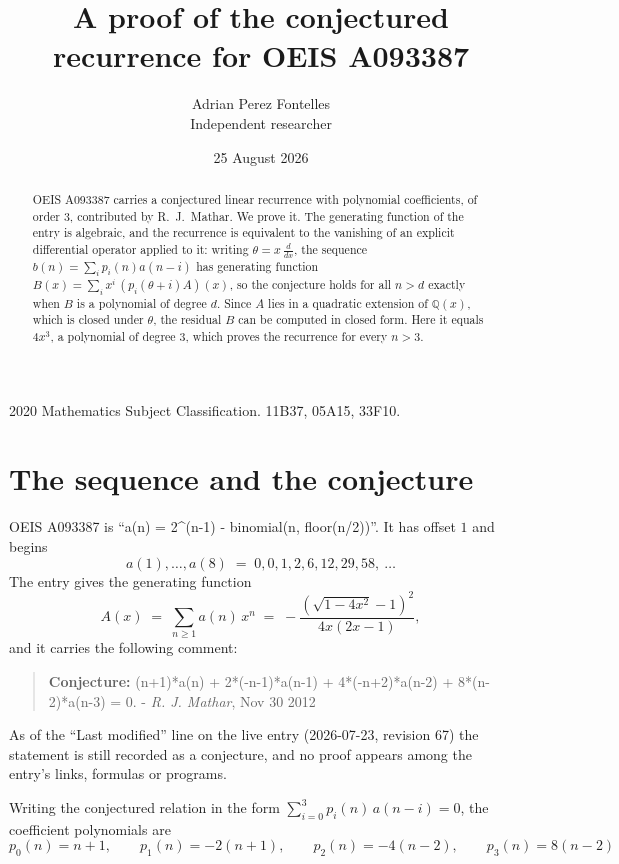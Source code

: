\documentclass[11pt,a4paper]{article}
\title{A proof of the conjectured recurrence for OEIS A093387}
\author{Adrian Perez Fontelles\\ \small Independent researcher}
\date{25 August 2026}
\theoremstyle{plain}
\theoremstyle{definition}
\begin{document}
\maketitle

\begin{abstract}
OEIS A093387 carries a conjectured linear recurrence with polynomial coefficients, of
order 3, contributed by R.~J.~Mathar. We prove it. The generating function of the
entry is algebraic, and the recurrence is equivalent to the vanishing of an explicit
differential operator applied to it: writing $\theta=x\,\frac{d}{dx}$, the sequence
$b(n)=\sum_{i}p_{i}(n)a(n-i)$ has generating function
$B(x)=\sum_{i}x^{i}\,(p_{i}(\theta+i)A)(x)$, so the conjecture holds for all $n>d$ exactly
when $B$ is a polynomial of degree $d$. Since $A$ lies in a quadratic extension of
$\mathbb{Q}(x)$, which is closed under $\theta$, the residual $B$ can be computed in
closed form. Here it equals $4 x^{3}$, a polynomial of degree $3$, which proves
the recurrence for every $n>3$.
\end{abstract}

\noindent\small 2020 Mathematics Subject Classification. 11B37, 05A15, 33F10.\normalsize

\section{The sequence and the conjecture}

OEIS A093387 is ``a(n) = 2\^{}(n-1) - binomial(n, floor(n/2))''. It has offset $1$ and begins
\[
a(1),\dots,a(8)\;=\;0, 0, 1, 2, 6, 12, 29, 58,\ \dots
\]
The entry gives the generating function
\begin{equation}\label{eq:gf}
A(x)\;=\;\sum_{n\ge 1} a(n)\,x^{n}\;=\;- \frac{\left(\sqrt{1 - 4 x^{2}} - 1\right)^{2}}{4 x \left(2 x - 1\right)} ,
\end{equation}
and it carries the following comment:
\begin{quote}\small
\textbf{Conjecture:} (n+1)*a(n) + 2*(-n-1)*a(n-1) + 4*(-n+2)*a(n-2) + 8*(n-2)*a(n-3) = 0. - \emph{R. J. Mathar}, Nov 30 2012
\end{quote}
As of the ``Last modified'' line on the live entry (2026-07-23, revision 67) the
statement is still recorded as a conjecture, and no proof appears among the entry's links,
formulas or programs.

Writing the conjectured relation in the form $\sum_{i=0}^{3}p_{i}(n)\,a(n-i)=0$,
the coefficient polynomials are
\[
p_{0}(n)=n + 1,\qquad p_{1}(n)=- 2 \left(n + 1\right),\qquad p_{2}(n)=- 4 \left(n - 2\right),\qquad p_{3}(n)=8 \left(n - 2\right)
\]
\end{document}
